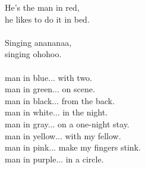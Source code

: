
He's the man in red, \\ he likes to do it in bed. \\ \hspace{10mm} \\ Singing anananaa, \\ singing ohohoo. \\ \hspace{10mm} \\ man in blue... with two. \\ man in green... on scene. \\ man in black... from the back. \\ man in white... in the night. \\ man in gray... on a one-night stay. \\ man in yellow... with my fellow. \\ man in pink... make my fingers stink. \\ man in purple... in a circle.
